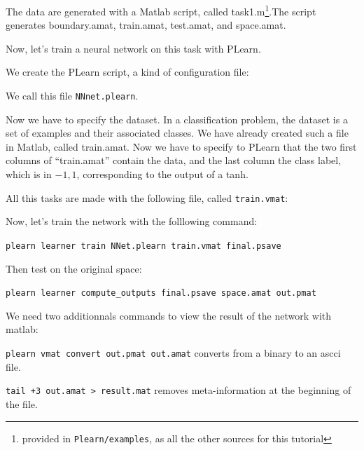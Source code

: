 The data are generated with a Matlab script, called 
task1.m\footnote{provided in \texttt{Plearn/examples}, as all the other sources for this tutorial}.The 
script generates boundary.amat, train.amat, test.amat, and space.amat.
% 

Now, let's train a neural network on this task with PLearn.

We create the PLearn script, a kind of configuration file:


We call this file \texttt{NNnet.plearn}.

Now we have to specify the dataset. In a classification problem, the dataset is 
a set of examples and their associated classes. We have already created such a 
file in Matlab, called train.amat.
Now we have to specify to PLearn that the two first columns of ``train.amat'' 
contain the data, and the last column the class label, which is in ${-1,1}$, 
corresponding to the output of a tanh.

All this tasks are made with the following file, called \texttt{train.vmat}:


Now, let's train the network with the folllowing command:

\texttt{plearn learner train NNet.plearn train.vmat final.psave}

Then test on the original space:

\texttt{plearn learner compute\_outputs final.psave space.amat 
out.pmat}

We need two additionnals commands to view the result of the network with matlab:

\texttt{plearn vmat convert out.pmat out.amat} converts from a binary to an ascci file.

\texttt{tail +3 out.amat > result.mat} removes meta-information at the beginning of the file.

